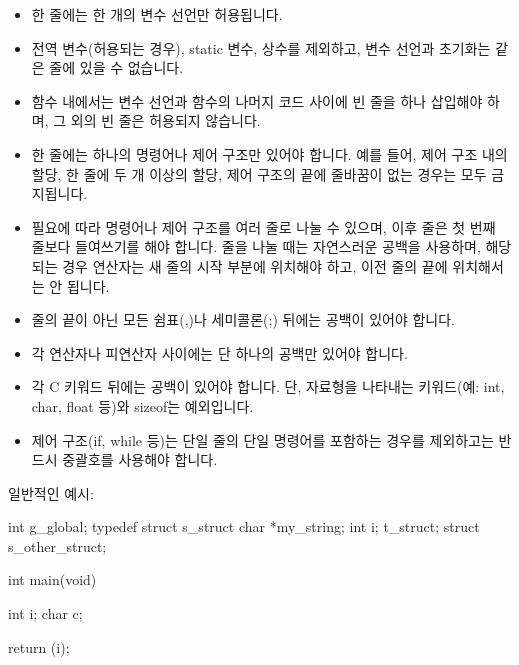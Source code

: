 \documentclass{42-ko}
\begin{document}
\begin{itemize}
                \item 한 줄에는 한 개의 변수 선언만 허용됩니다.

                \item 전역 변수(허용되는 경우), static 변수, 상수를 제외하고,
                  변수 선언과 초기화는 같은 줄에 있을 수 없습니다.

                \item 함수 내에서는 변수 선언과 함수의 나머지 코드 사이에 빈 줄을 하나
                  삽입해야 하며, 그 외의 빈 줄은 허용되지 않습니다.

                \item 한 줄에는 하나의 명령어나 제어 구조만 있어야 합니다.
                  예를 들어, 제어 구조 내의 할당, 한 줄에 두 개 이상의 할당,
                  제어 구조의 끝에 줄바꿈이 없는 경우는 모두 금지됩니다.

                \item 필요에 따라 명령어나 제어 구조를 여러 줄로 나눌 수 있으며,
                  이후 줄은 첫 번째 줄보다 들여쓰기를 해야 합니다. 줄을 나눌 때는
                  자연스러운 공백을 사용하며, 해당되는 경우 연산자는 새 줄의
                  시작 부분에 위치해야 하고, 이전 줄의 끝에 위치해서는 안 됩니다.

                \item 줄의 끝이 아닌 모든 쉼표(,)나 세미콜론(;) 뒤에는 공백이 있어야 합니다.

                \item 각 연산자나 피연산자 사이에는 단 하나의 공백만 있어야 합니다.

                \item 각 C 키워드 뒤에는 공백이 있어야 합니다. 단, 자료형을 나타내는
                  키워드(예: int, char, float 등)와 sizeof는 예외입니다.

                \item 제어 구조(if, while 등)는 단일 줄의 단일 명령어를 포함하는
                  경우를 제외하고는 반드시 중괄호를 사용해야 합니다.

            \end{itemize}

\vspace{1cm}

            일반적인 예시:
            \begin{42ccode}
int             g_global;
typedef struct  s_struct
{
    char    *my_string;
    int     i;
}               t_struct;
struct          s_other_struct;

int     main(void)
{
    int     i;
    char    c;

    return (i);
}
            \end{42ccode}
            \newpage
\end{document}
